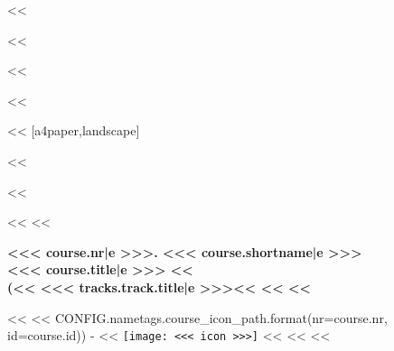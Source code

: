 <<%

<<%

<<%
    \usepackage{pgfpages}
<<%

<<%
    \geometry{top=1cm,bottom=1cm,left=1cm,right=1cm}
    [a4paper,landscape] %

    \ifoot[]{}
    \ihead[]{}
    \cfoot[]{}
    \ofoot[]{}
<<%

<<%

<<%
    <<%

        \begin{minipage}[t]{\textwidth-2.5cm}%
            \vspace{0pt}
            \raggedright
            \headingfamily\bfseries\Large{}<<< course.nr|e >>>. <<< course.shortname|e >>>\\
            \normalsize{}<<< course.title|e >>>
            <<%
                \\
                (<<%
                    <<< tracks.track.title|e >>><<%
                <<%
            <<%
        \end{minipage}%
        \hspace{0.5cm}%
        \begin{minipage}[t][2cm][t]{2cm}
            \vspace{0pt}
            <<%
                <<%
                        CONFIG.nametags.course_icon_path.format(nr=course.nr, id=course.id)) -%
                    <<%
                        \texttt{[image: <<< icon >>>]}%
                    <<%
                <<%
            <<%
        \end{minipage}

